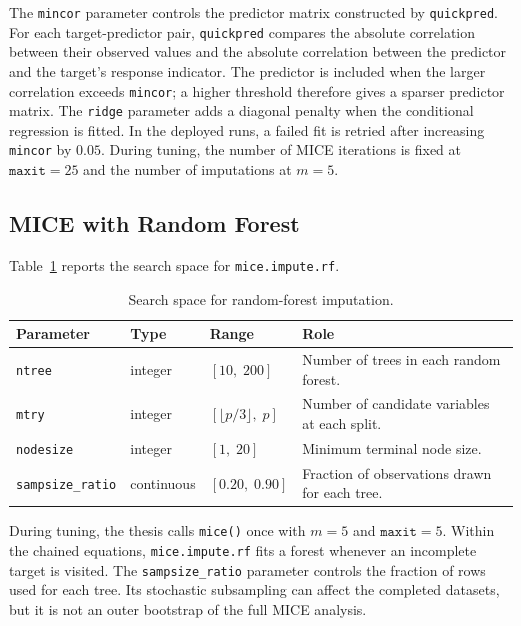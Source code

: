 The \texttt{mincor} parameter controls the predictor matrix constructed by \texttt{quickpred}. For each target-predictor pair, \texttt{quickpred} compares the absolute correlation between their observed values and the absolute correlation between the predictor and the target's response indicator. The predictor is included when the larger correlation exceeds \texttt{mincor}; a higher threshold therefore gives a sparser predictor matrix. The \texttt{ridge} parameter adds a diagonal penalty when the conditional regression is fitted. In the deployed runs, a failed fit is retried after increasing \texttt{mincor} by $0.05$. During tuning, the number of MICE iterations is fixed at $\texttt{maxit}=25$ and the number of imputations at $m=5$.

\subsection{MICE with Random Forest}

Table~\ref{tab:tune_mice_rf} reports the search space for \texttt{mice.impute.rf}.

\begin{table}[ht]
\centering
\caption{Search space for random-forest imputation.}
\label{tab:tune_mice_rf}
\begin{tabularx}{\textwidth}{lll>{\raggedright\arraybackslash}X}
\toprule
Parameter & Type & Range & Role \\
\midrule
\texttt{ntree} & integer & $[10,\; 200]$ &
    Number of trees in each random forest. \\
\texttt{mtry} & integer & $[\lfloor p/3 \rfloor,\; p]$ &
    Number of candidate variables at each split. \\
\texttt{nodesize} & integer & $[1,\; 20]$ &
    Minimum terminal node size. \\
\texttt{sampsize\_ratio} & continuous & $[0.20,\; 0.90]$ &
    Fraction of observations drawn for each tree. \\
\bottomrule
\end{tabularx}
\end{table}

During tuning, the thesis calls \texttt{mice()} once with $m=5$ and $\texttt{maxit}=5$. Within the chained equations, \texttt{mice.impute.rf} fits a forest whenever an incomplete target is visited. The \texttt{sampsize\_ratio} parameter controls the fraction of rows used for each tree. Its stochastic subsampling can affect the completed datasets, but it is not an outer bootstrap of the full MICE analysis.

